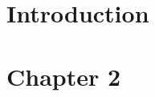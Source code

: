\documentclass[pdftex,12pt,a4paper,oneside]{article}
\numberwithin{equation}{section} %
\begin{document}




\newpage
\pagestyle{fancy}
\tableofcontents
\thispagestyle{fancy}
\vspace{2cm}


\section{Introduction}
\section{Chapter 2}




\end{document}
